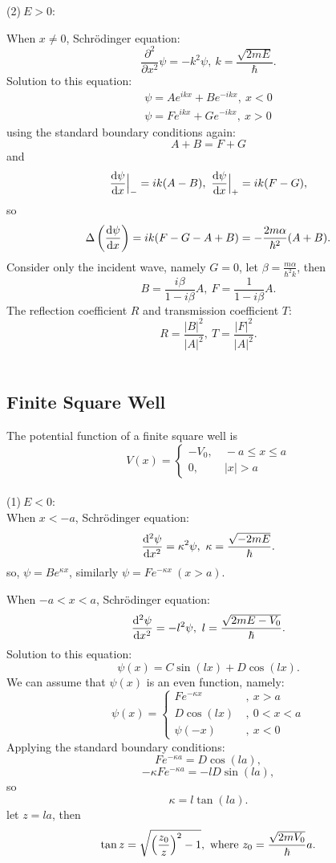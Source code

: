 \documentclass[12pt, 
]{article}
\begin{document}
\noindent (2)$~E>0$:

\noindent When $x\neq 0$, Schr\"odinger equation:
\[
	\frac{\partial^2}{\partial x^2}\psi=-k^2\psi, ~k=\frac{\sqrt{2mE}}{\hbar}.
\]
Solution to this equation:
\begin{eqnarray*}
	\psi=Ae^{ikx}+Be^{-ikx},~x<0\\
	\psi=Fe^{ikx}+Ge^{-ikx},~x>0
\end{eqnarray*}
using the standard boundary conditions again:
\[
	A+B=F+G
\]
and
\[
	\frac{{\rm d}\psi}{{\rm d}x}\Big|_{-}=ik(A-B),~\frac{{\rm d}\psi}{{\rm d}x}\Big|_+=ik(F-G),
\]
so
\[
	\Delta\left(\frac{{\rm d}\psi}{{\rm d}x}\right)=ik(F-G-A+B)=-\frac{2m\alpha}{\hbar^2}(A+B).
\]
Consider only the incident wave, namely $G=0$, let $\displaystyle\beta=\frac{m\alpha}{\hbar^2k}$, then
\[
	B=\frac{i\beta}{1-i\beta}A,~F=\frac{1}{1-i\beta}A.
\]
The reflection coefficient $R$ and transmission coefficient $T$:
\[
	R=\frac{|B|^2}{|A|^2},~T=\frac{|F|^2}{|A|^2}.
\]
~\\

\subsection{Finite Square Well}
The potential function of a finite square well is 
\[
	V(x)=\left\{
	\begin{array}{rl}
		-V_0,&~-a\leqslant x\leqslant a\\
		0,&~|x|>a
	\end{array}
	\right.
\]
~\\
\noindent (1)$~E<0$:
~\\\noindent When $x<-a$, Schr\"odinger equation:
\[
	\frac{{\rm d}^2\psi}{{\rm d}x^2}=\kappa^2\psi, ~\kappa=\frac{\sqrt{-2mE}}{\hbar}.
\]
so, $\psi=Be^{\kappa x}$, similarly $\psi=Fe^{-\kappa x}~(x>a)$.

\noindent When $-a<x<a$, Schr\"odinger equation:
\[
	\frac{{\rm d}^2\psi}{{\rm d}x^2}=-l^2\psi, ~l=\frac{\sqrt{2m{E-V_0}}}{\hbar}.
\]
Solution to this equation:
\[
	\psi(x)=C\sin(lx)+D\cos(lx).
\]
We can assume that $\psi(x)$ is an even function, namely:
\[
	\psi(x)=\left\{
	\begin{array}{ll}
		Fe^{-\kappa x}&~,~x>a\\
		D\cos(lx)&~,~0<x<a\\
		\psi(-x)&~,~x<0
	\end{array}
	\right.
\]
Applying the standard boundary conditions:
\[
	Fe^{-\kappa a} = D \cos(la),
\]
\[
	-\kappa F e^{-\kappa a}=-lD\sin(la),
\]
so \[
	\kappa=l\tan(la).
\]
let $z=la$, then
\[
	\tan z=\sqrt{\left(\frac{z_0}{z}\right)^2-1}, ~{\rm where}~z_0=\frac{\sqrt{2mV_0}}{\hbar}a.
\]
\end{document}
